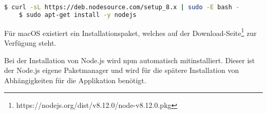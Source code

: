 \begin{lstlisting}[language=bash, caption=Installation von Node.js, label=Installation von Node.js]
    $ curl -sL https://deb.nodesource.com/setup_8.x | sudo -E bash -
    $ sudo apt-get install -y nodejs
\end{lstlisting}

Für macOS existiert ein Installationspaket, welches auf der Download-Seite\footnote{https://nodejs.org/dist/v8.12.0/node-v8.12.0.pkg}
zur Verfügung steht.

Bei der Installation von Node.js wird npm automatisch mitinstalliert. Dieser ist der Node.js eigene Paketmanager und wird
für die spätere Installation von Abhängigkeiten für die Applikation benötigt.